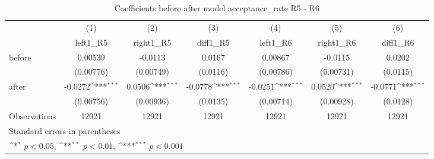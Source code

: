 \begin{table}[htbp]\centering
\def\sym#1{\ifmmode^{#1}\else\(^{#1}\)\fi}
\caption{Coefficients before after model acceptance\_rate R5 - R6}
\begin{tabular}{l*{6}{c}}
\hline\hline
                    &\multicolumn{1}{c}{(1)}&\multicolumn{1}{c}{(2)}&\multicolumn{1}{c}{(3)}&\multicolumn{1}{c}{(4)}&\multicolumn{1}{c}{(5)}&\multicolumn{1}{c}{(6)}\\
                    &\multicolumn{1}{c}{left1\_R5}&\multicolumn{1}{c}{right1\_R5}&\multicolumn{1}{c}{diff1\_R5}&\multicolumn{1}{c}{left1\_R6}&\multicolumn{1}{c}{right1\_R6}&\multicolumn{1}{c}{diff1\_R6}\\
\hline
before              &     0.00539         &     -0.0113         &      0.0167         &     0.00867         &     -0.0115         &      0.0202         \\
                    &   (0.00776)         &   (0.00749)         &    (0.0116)         &   (0.00786)         &   (0.00731)         &    (0.0115)         \\
[1em]
after               &     -0.0272\sym{***}&      0.0506\sym{***}&     -0.0778\sym{***}&     -0.0251\sym{***}&      0.0520\sym{***}&     -0.0771\sym{***}\\
                    &   (0.00756)         &   (0.00936)         &    (0.0135)         &   (0.00714)         &   (0.00928)         &    (0.0128)         \\
\hline
Observations        &       12921         &       12921         &       12921         &       12921         &       12921         &       12921         \\
\hline\hline
\multicolumn{7}{l}{\footnotesize Standard errors in parentheses}\\
\multicolumn{7}{l}{\footnotesize \sym{*} \(p<0.05\), \sym{**} \(p<0.01\), \sym{***} \(p<0.001\)}\\
\end{tabular}
\end{table}
